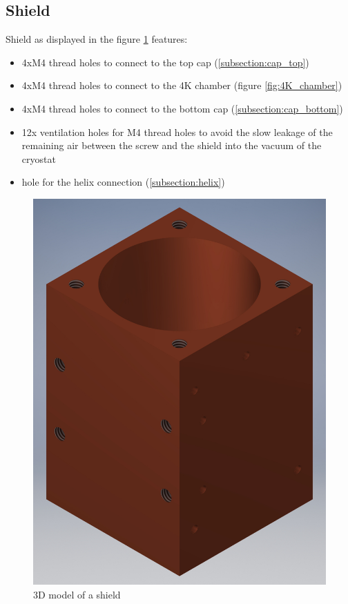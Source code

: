 \clearpage
\subsection{Shield}
\label{subsection:shield}
Shield as displayed in the figure \ref{fig:shield} features:
\begin{itemize}
	\item 4xM4 thread holes to connect to the top cap (\ref{subsection:cap_top})
	\item 4xM4 thread holes to connect to the 4K chamber (figure \ref{fig:4K_chamber})
	\item 4xM4 thread holes to connect to the bottom cap (\ref{subsection:cap_bottom})
	\item 12x ventilation holes for M4 thread holes to avoid the slow leakage of the remaining air between the screw and the shield into the vacuum of the cryostat	
	\item hole for the helix connection (\ref{subsection:helix})
\end{itemize}

\begin{figure}[h]
	\centering
	\includegraphics[width=.81\textwidth]{images/shield_small}
	\caption{3D model of a shield}
	\label{fig:shield}
\end{figure}

